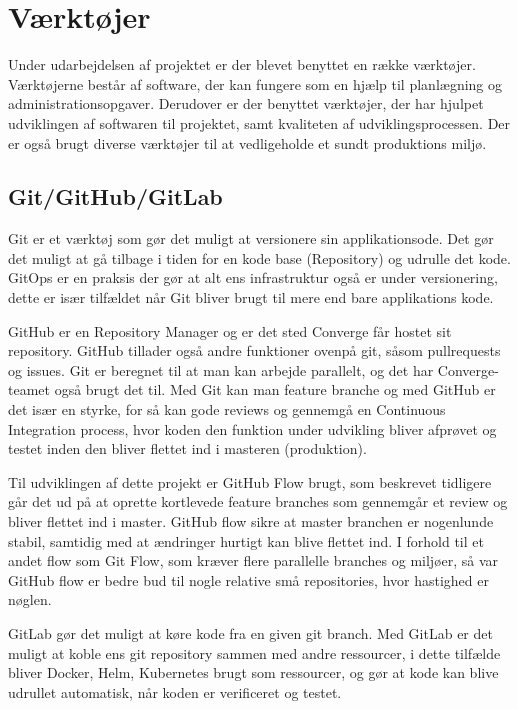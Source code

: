 \section{Værktøjer}

Under udarbejdelsen af projektet er der blevet benyttet en række værktøjer. Værktøjerne består af software, der kan fungere som en hjælp til planlægning og administrationsopgaver. Derudover er der benyttet værktøjer, der har hjulpet udviklingen af softwaren til projektet, samt kvaliteten af udviklingsprocessen. Der er også brugt diverse værktøjer til at vedligeholde et sundt produktions miljø.

\subsection{Git/GitHub/GitLab}

Git er et værktøj som gør det muligt at versionere sin applikationsode. Det gør det muligt at gå tilbage i tiden for en kode base (Repository) og udrulle det kode. GitOps er en praksis der gør at alt ens infrastruktur også er under versionering, dette er især tilfældet når Git bliver brugt til mere end bare applikations kode.

GitHub er en Repository Manager og er det sted Converge får hostet sit repository. GitHub tillader også andre funktioner ovenpå git, såsom pullrequests og issues. Git er beregnet til at man kan arbejde parallelt, og det har Converge-teamet også brugt det til. Med Git kan man feature branche og med GitHub er det især en styrke, for så kan gode reviews og gennemgå en Continuous Integration process, hvor koden den funktion under udvikling bliver afprøvet og testet inden den bliver flettet ind i masteren (produktion).

Til udviklingen af dette projekt er GitHub Flow brugt, som beskrevet tidligere går det ud på at oprette kortlevede feature branches som gennemgår et review og bliver flettet ind i master. GitHub flow sikre at master branchen er nogenlunde stabil, samtidig med at ændringer hurtigt kan blive flettet ind. I forhold til et andet flow som Git Flow, som kræver flere parallelle branches og miljøer, så var GitHub flow er bedre bud til nogle relative små repositories, hvor hastighed er nøglen.

GitLab gør det muligt at køre kode fra en given git branch. Med GitLab er det muligt at koble ens git repository sammen med andre ressourcer, i dette tilfælde bliver Docker, Helm, Kubernetes brugt som ressourcer, og gør at kode kan blive udrullet automatisk, når koden er verificeret og testet.

